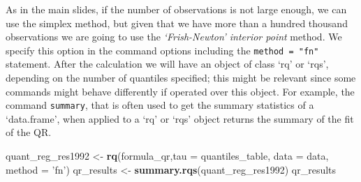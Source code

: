 \documentclass[]{book}
\newenvironment{Shaded}{\begin{snugshade}}{\end{snugshade}}
\newcommand{\KeywordTok}[1]{\textcolor[rgb]{0.13,0.29,0.53}{\textbf{#1}}}
\newcommand{\DataTypeTok}[1]{\textcolor[rgb]{0.13,0.29,0.53}{#1}}
\newcommand{\StringTok}[1]{\textcolor[rgb]{0.31,0.60,0.02}{#1}}
\newcommand{\NormalTok}[1]{#1}
\begin{document}
As in the main slides, if the number of observations is not large
enough, we can use the simplex method, but given that we have more than
a hundred thousand observations we are going to use the
\emph{`Frish-Newton' interior point} method. We specify this option in
the command options including the \texttt{method\ =\ "fn"} statement.
After the calculation we will have an object of class `rq' or `rqs',
depending on the number of quantiles specified; this might be relevant
since some commands might behave differently if operated over this
object. For example, the command \texttt{summary}, that is often used to
get the summary statistics of a `data.frame', when applied to a `rq' or
`rqs' object returns the summary of the fit of the QR.

\begin{Shaded}
\begin{Highlighting}[]
\NormalTok{quant_reg_res1992 <-}\StringTok{ }\KeywordTok{rq}\NormalTok{(formula_qr,}\DataTypeTok{tau =}\NormalTok{ quantiles_table, }\DataTypeTok{data =}\NormalTok{ data, }\DataTypeTok{method =} \StringTok{'fn'}\NormalTok{)}
\NormalTok{qr_results <-}\StringTok{ }\KeywordTok{summary.rqs}\NormalTok{(quant_reg_res1992)}
\NormalTok{qr_results}
\end{Highlighting}
\end{Shaded}
\end{document}

